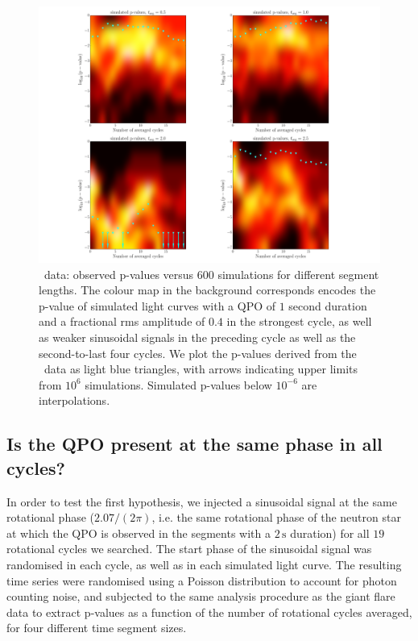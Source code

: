 \documentclass{emulateapj}
\begin{document}
 \begin{figure}[htbp]
\begin{center}
\includegraphics[width=1.1\textwidth]{f9.pdf}
\caption{\rhessi\ data: observed p-values versus $600$ simulations for different segment lengths. The colour map in the background corresponds encodes the p-value of simulated light curves with a QPO of $1$ second duration and a fractional rms amplitude of $0.4$ in the strongest cycle, as well as weaker sinusoidal signals in the preceding cycle as well as the second-to-last four cycles. We plot the p-values derived from the \rhessi\ data as light blue triangles, with arrows indicating upper limits from $10^{6}$ simulations. Simulated p-values below $10^{-6}$ are interpolations.}
\label{fig:rhessi_sims3_pvalues}
\end{center}
\end{figure}

\subsection{Is the QPO present at the same phase in all cycles?}

In order to test the first hypothesis, we injected a sinusoidal signal at the same rotational phase ($2.07/(2\pi)$, i.e. the same rotational phase of the neutron star at which the QPO is observed in the segments with a $2\,\mathrm{s}$ duration) for all $19$ rotational cycles we searched. The start phase of the sinusoidal signal was randomised in each cycle, as well as in each simulated light curve. The resulting time series were randomised using a Poisson distribution to account for photon counting noise, and subjected to the same analysis procedure as the giant flare data to extract p-values as a function of the number of rotational cycles averaged, for four different time segment sizes.
\end{document}

